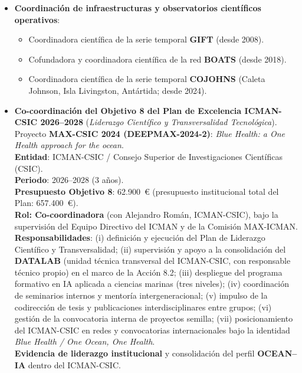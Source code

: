 \documentclass[11pt,a4paper]{article}
\begin{document}
\begin{itemize}[leftmargin=*]
    \item \textbf{Coordinación de infraestructuras y observatorios científicos operativos}:
    \begin{itemize}
        \item Coordinadora científica de la serie temporal \textbf{GIFT} (desde 2008).
        \item Cofundadora y coordinadora científica de la red \textbf{BOATS} (desde 2018).
        \item Coordinadora científica de la serie temporal \textbf{COJOHNS} (Caleta Johnson, Isla Livingston, Antártida; desde 2024).
    \end{itemize}

    \item \textbf{Co-coordinación del Objetivo 8 del Plan de Excelencia ICMAN-CSIC 2026--2028} (\textit{Liderazgo Científico y Transversalidad Tecnológica}).\\
    Proyecto \textbf{MAX-CSIC 2024 (DEEPMAX-2024-2)}: \textit{Blue Health: a One Health approach for the ocean}.\\
    \textbf{Entidad}: ICMAN-CSIC / Consejo Superior de Investigaciones Científicas (CSIC).\\
    \textbf{Periodo}: 2026--2028 (3 años).\\
    \textbf{Presupuesto Objetivo 8}: 62.900~€ (presupuesto institucional total del Plan: 657.400~€).\\
    \textbf{Rol: Co-coordinadora} (con Alejandro Román, ICMAN-CSIC), bajo la supervisión del Equipo Directivo del ICMAN y de la Comisión MAX-ICMAN.\\
    \textbf{Responsabilidades}: (i) definición y ejecución del Plan de Liderazgo Científico y Transversalidad; (ii) supervisión y apoyo a la consolidación del \textbf{DATALAB} (unidad técnica transversal del ICMAN-CSIC, con responsable técnico propio) en el marco de la Acción 8.2; (iii) despliegue del programa formativo en IA aplicada a ciencias marinas (tres niveles); (iv) coordinación de seminarios internos y mentoría intergeneracional; (v) impulso de la codirección de tesis y publicaciones interdisciplinares entre grupos; (vi) gestión de la convocatoria interna de proyectos semilla; (vii) posicionamiento del ICMAN-CSIC en redes y convocatorias internacionales bajo la identidad \textit{Blue Health / One Ocean, One Health}.\\
    \textbf{Evidencia de liderazgo institucional} y consolidación del perfil \textbf{OCEAN--IA} dentro del ICMAN-CSIC.


\end{itemize}
\end{document}
